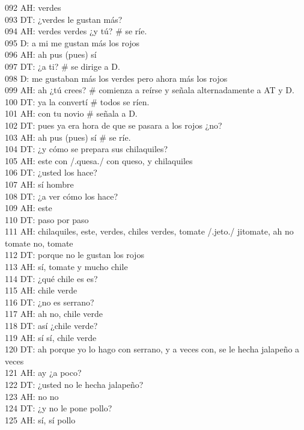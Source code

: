 092 AH: verdes\\
093 DT: ¿verdes le gustan más?\\
094 AH: verdes verdes ¿y tú? \# se ríe.\\
095 D: a mi me gustan más los rojos\\
096 AH: ah pus (pues) sí\\
097 DT: ¿a ti? \# se dirige a D.\\
098 D: me gustaban más los verdes pero ahora más los rojos\\
099 AH: ah ¿tú crees? \# comienza a reírse y señala alternadamente a AT y D.\\
100 DT: ya la convertí \# todos se ríen.\\
101 AH: con tu novio \# señala a D.\\
102 DT: pues ya era hora de que se pasara a los rojos ¿no?\\
103 AH: ah pus (pues) sí \# se ríe.\\
104 DT: ¿y cómo se prepara sus chilaquiles?\\
105 AH: este con /.quesa./ con queso, y chilaquiles\\
106 DT: ¿usted los hace?\\
107 AH: sí hombre\\
108 DT: ¿a ver cómo los hace?\\
109 AH: este\\
110 DT: paso por paso\\
111 AH: chilaquiles, este, verdes, chiles verdes, tomate /.jeto./ jitomate, ah no tomate no, tomate\\
112 DT: porque no le gustan los rojos\\
113 AH: sí, tomate y mucho chile\\
114 DT: ¿qué chile es es?\\
115 AH: chile verde\\
116 DT: ¿no es serrano?\\
117 AH: ah no, chile verde\\
118 DT: así ¿chile verde?\\
119 AH: sí sí, chile verde\\
120 DT: ah porque yo lo hago con serrano, y a veces con, se le hecha jalapeño a veces\\
121 AH: ay ¿a poco?\\
122 DT: ¿usted no le hecha jalapeño?\\
123 AH: no no\\
124 DT: ¿y no le pone pollo?\\
125 AH: sí, sí pollo\\
